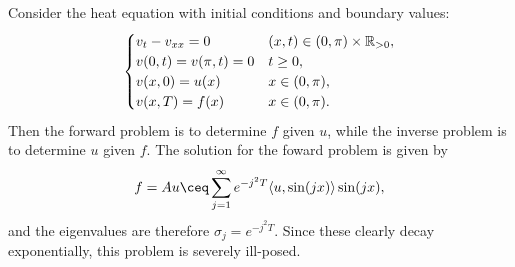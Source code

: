 \begin{example}
    Consider the heat equation with initial conditions and boundary values:
    \[
    \begin{cases}
        v_t - v_{xx} = 0 &(x, t) \in (0, \pi) \times \mathbb R_{>0}, \\
        v(0, t) = v(\pi, t) = 0 &t \geq 0, \\
        v(x, 0) = u(x) &x \in (0, \pi), \\
        v(x, T) = f(x) &x \in (0, \pi). 
    \end{cases}
    \]
    Then the forward problem is to determine $f$ given $u$, while the inverse problem is to determine $u$ given $f$. The solution for the foward problem is given by
    \[
    f = Au \ceq \sum_{j=1}^\infty e^{-j^2T} \ang{u, \sin(jx)}  \sin(jx), 
    \]
    and the eigenvalues are therefore $\sigma_j = e^{-j^2T}$. Since these clearly decay exponentially, this problem is severely ill-posed. 
\end{example}